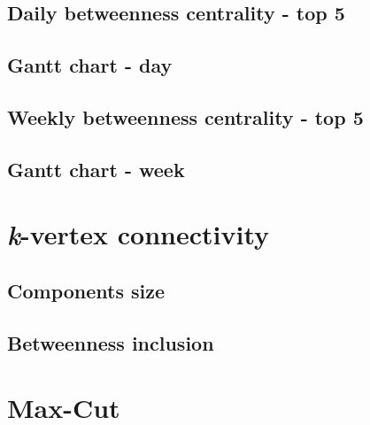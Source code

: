 	\subsection{Daily betweenness centrality - top 5}
	\subsection{Gantt chart - day}
	\subsection{Weekly betweenness centrality - top 5}
	\subsection{Gantt chart - week}
	\section{\textit{k}-vertex connectivity}
	\subsection{Components size}
	\subsection{Betweenness inclusion}
	\section{Max-Cut}
